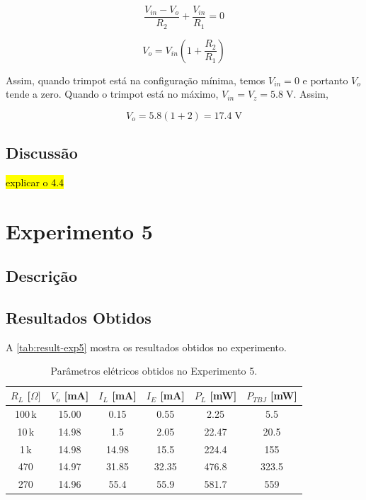 \documentclass[
	12pt,				%
	oneside,			%
	a4paper,			%
	chapter=TITLE,
	sumario=tradicional,
	english,			%
	brazil				%
]{abntex2}
\newcommand{\un}[1]{\;\text{#1}}
\begin{document}
\[ \frac{V_{in} - V_o}{R_2} + \frac{V_{in}}{R_1} = 0 \]

\[ V_o = V_{in} \left( 1 + \frac{R_2}{R_1} \right) \]

Assim, quando trimpot está na configuração mínima, temos $V_{in} = 0$ e portanto 
$V_o$ tende a zero. Quando o trimpot está no máximo, $V_{in} = V_z = 5.8 \un{V} $.
Assim, 

\[ V_o = 5.8 \left( 1 + 2 \right) = 17.4 \un{V} \]



\subsection{Discussão}

\hl{explicar o 4.4}

\section{Experimento 5}

\subsection{Descrição}

\subsection{Resultados Obtidos}

A \autoref{tab:result-exp5} mostra os resultados obtidos no experimento.

\begin{table}[htb]
	\caption{Parâmetros elétricos obtidos no Experimento 5.}
	\centering
	\begin{tabular}{c|c|c|c|c|c}
		\hline
		\textbf{$R_L$ [$\Omega]$} & \textbf{$V_o$ [mA]} & \textbf{$I_L$ [mA]} & \textbf{$I_E$ [mA]} & \textbf{$P_{L}$ [mW]} & \textbf{$P_{TBJ}$ [mW]} \\
		\hline
		100\,k & 15.00 & 0.15 & 0.55 & 2.25 & 5.5 \\
		10\,k  & 14.98 & 1.5 & 2.05 & 22.47 & 20.5 \\
		1\,k   & 14.98 & 14.98 & 15.5 & 224.4 & 155 \\
		470    & 14.97 & 31.85 & 32.35 & 476.8 & 323.5 \\
		270    & 14.96 & 55.4 & 55.9 & 581.7 & 559 \\
		\hline
	\end{tabular}
	\label{tab:result-exp5}
\end{table}
\end{document}
